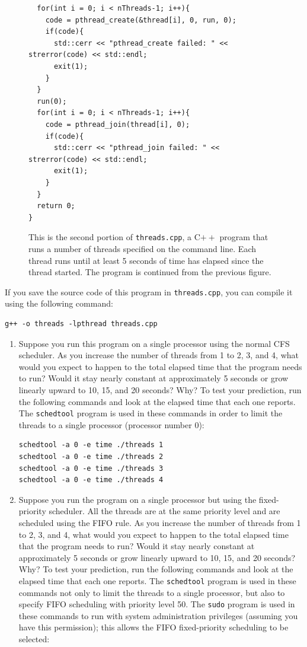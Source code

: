 \begin{chapterEnumerate}
\begin{figure}
\begin{verbatim}
  for(int i = 0; i < nThreads-1; i++){
    code = pthread_create(&thread[i], 0, run, 0);
    if(code){
      std::cerr << "pthread_create failed: " << strerror(code) << std::endl;
      exit(1);
    }
  }
  run(0);
  for(int i = 0; i < nThreads-1; i++){
    code = pthread_join(thread[i], 0);
    if(code){
      std::cerr << "pthread_join failed: " << strerror(code) << std::endl;
      exit(1);
    }
  }
  return 0;
}
\end{verbatim}
\caption{This is the second portion of \texttt{threads.cpp}, a C$++$ program that runs a number of threads specified on the command line.  Each thread runs until at least 5 seconds of time has elapsed since the thread started.  The program is continued from the previous figure.}\label{threads.cpp-part2}
\end{figure}
If you save the source code of this program in \texttt{threads.cpp}, you can compile it using the following command:
\begin{verbatim}
g++ -o threads -lpthread threads.cpp
\end{verbatim}
\begin{enumerate}
\item
Suppose you run this program on a single processor using the normal CFS scheduler.  As you increase the number of threads from 1 to 2, 3, and 4, what would you expect to happen to the total elapsed time that the program needs to run?  Would it stay nearly constant at approximately 5 seconds or grow linearly upward to 10, 15, and 20 seconds?  Why?  To test your prediction, run the following commands and look at the elapsed time that each one reports.  The \texttt{schedtool} program is used in these commands in order to limit the threads to a single processor (processor number 0):
\begin{verbatim}
schedtool -a 0 -e time ./threads 1
schedtool -a 0 -e time ./threads 2
schedtool -a 0 -e time ./threads 3
schedtool -a 0 -e time ./threads 4
\end{verbatim}
\item
Suppose you run the program on a single processor but using the fixed-priority scheduler.  All
the threads are at the same priority level and are scheduled using the FIFO rule.
As you increase the number of threads from 1 to 2, 3, and 4, what would you expect to happen to the total elapsed time that the program needs to run?  Would it stay nearly constant at approximately 5 seconds or grow linearly upward to 10, 15, and 20 seconds?  Why?  To test your prediction, run the following commands and look at the elapsed time that each one reports.  The \texttt{schedtool} program is used in these commands not only to limit the threads to a single processor, but also to specify FIFO scheduling with priority level 50.  The \texttt{sudo} program is used in these commands to run with system administration privileges (assuming you have this permission); this allows the FIFO fixed-priority scheduling to be selected:

\end{enumerate}
\end{chapterEnumerate}
